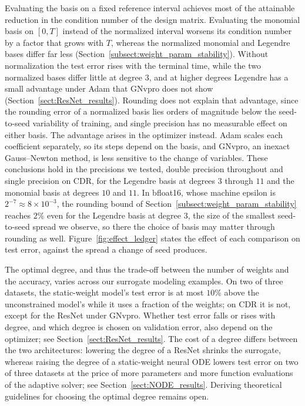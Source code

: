 \documentclass[pdflatex,sn-mathphys-num]{sn-jnl}%
\theoremstyle{thmstyleone}%
\theoremstyle{thmstyletwo}%
\theoremstyle{thmstylethree}%
\begin{document}
Evaluating the basis on a fixed reference interval achieves most of the attainable reduction in the condition number of the design matrix.
%
Evaluating the monomial basis on $[0,T]$ instead of the normalized interval worsens its condition number by a factor that grows with $T$, whereas the normalized monomial and Legendre bases differ far less (Section~\ref{subsect:weight_param_stability}).
%
Without normalization the test error rises with the terminal time, while the two normalized bases differ little at degree $3$, and at higher degrees Legendre has a small advantage under Adam that GNvpro does not show (Section~\ref{sect:ResNet_results}).
%
Rounding does not explain that advantage, since the rounding error of a normalized basis lies orders of magnitude below the seed-to-seed variability of training, and single precision has no measurable effect on either basis.
%
The advantage arises in the optimizer instead. Adam scales each coefficient separately, so its steps depend on the basis, and GNvpro, an inexact Gauss--Newton method, is less sensitive to the change of variables.
%
These conclusions hold in the precisions we tested, double precision throughout and single precision on CDR, for the Legendre basis at degrees $3$ through $11$ and the monomial basis at degrees $10$ and $11$.
%
In bfloat16, whose machine epsilon is $2^{-7}\approx 8\times10^{-3}$, the rounding bound of Section~\ref{subsect:weight_param_stability} reaches $2\%$ even for the Legendre basis at degree $3$, the size of the smallest seed-to-seed spread we observe, so there the choice of basis may matter through rounding as well.
%
Figure~\ref{fig:effect_ledger} states the effect of each comparison on test error, against the spread a change of seed produces.

The optimal degree, and thus the trade-off between the number of weights and the accuracy, varies across our surrogate modeling examples.
%
On two of three datasets, the static-weight model's test error is at most $10\%$ above the unconstrained model's while it uses a fraction of the weights; on CDR it is not, except for the ResNet under GNvpro.
%
Whether test error falls or rises with degree, and which degree is chosen on validation error, also depend on the optimizer; see Section~\ref{sect:ResNet_results}.
%
The cost of a degree differs between the two architectures: lowering the degree of a ResNet shrinks the surrogate, whereas raising the degree of a static-weight neural ODE lowers test error on two of three datasets at the price of more parameters and more function evaluations of the adaptive solver; see Section~\ref{sect:NODE_results}.
%
Deriving theoretical guidelines for choosing the optimal degree remains open.
\end{document}
